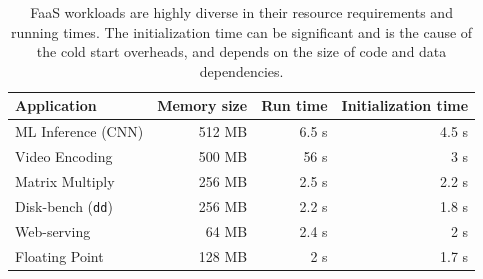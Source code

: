 \begin{table}
  \centering
  \caption{FaaS workloads are highly diverse in their resource requirements and running times. The initialization time can be significant and is the cause of the cold start overheads, and depends on the size of code and data dependencies.}
  \begin{tabular}{lrrr}
    \hline 
    Application & Memory size & Run time & Initialization time \\
    \hline
    ML Inference (CNN) & 512 MB & 6.5 s & 4.5 s \\
    Video Encoding & 500 MB & 56 s & 3 s \\
    Matrix Multiply & 256 MB & 2.5 s & 2.2 s \\
    Disk-bench (\texttt{dd})  & 256 MB & 2.2 s & 1.8 s \\
    Web-serving & 64 MB & 2.4 s & 2 s \\
    Floating Point & 128 MB & 2 s & 1.7 s \\
    \hline
  \end{tabular}
  \label{tab:bg-workloads}
\end{table}





